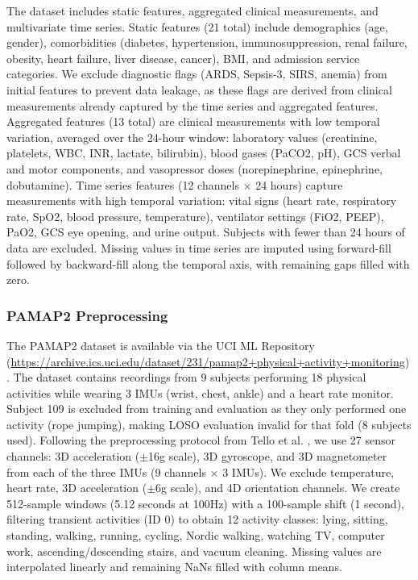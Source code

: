 \documentclass[times, review, 10pt]{elsarticle}
\begin{document}
The dataset includes static features, aggregated clinical measurements, and multivariate time
series. Static features (21 total) include demographics (age, gender), comorbidities (diabetes,
hypertension, immunosuppression, renal failure, obesity, heart failure, liver disease, cancer),
BMI, and admission service categories. We exclude diagnostic flags (ARDS, Sepsis-3, SIRS,
anemia) from initial features to prevent data leakage, as these flags are derived from clinical
measurements already captured by the time series and aggregated features.
Aggregated features (13 total) are clinical measurements with low temporal
variation, averaged over the 24-hour window: laboratory values (creatinine,
platelets, WBC, INR, lactate, bilirubin), blood gases (PaCO2, pH), GCS verbal
and motor components, and vasopressor doses (norepinephrine, epinephrine, dobutamine).
Time series features (12 channels $\times$ 24 hours) capture measurements with
high temporal variation: vital signs (heart rate, respiratory rate, SpO2,
blood pressure, temperature), ventilator settings (FiO2, PEEP), PaO2, GCS eye opening, and urine output.
Subjects with fewer than 24 hours of data are excluded. Missing values in time series are imputed using forward-fill followed by
backward-fill along the temporal axis, with remaining gaps filled with zero.


\subsubsection{PAMAP2 Preprocessing}

The PAMAP2 dataset is available via the UCI ML Repository
(\url{https://archive.ics.uci.edu/dataset/231/pamap2+physical+activity+monitoring}).
The dataset contains recordings from 9 subjects performing 18 physical
activities while wearing 3 IMUs (wrist, chest, ankle) and a heart rate monitor.
Subject 109 is excluded from training and evaluation as they only performed one activity
(rope jumping), making LOSO evaluation invalid for that fold (8 subjects used).
Following the preprocessing protocol from Tello et al. \cite{tello2025contrasting}, we
use 27 sensor channels: 3D acceleration ($\pm$16g scale), 3D gyroscope, and
3D magnetometer from each of the three IMUs (9 channels $\times$ 3 IMUs).
We exclude temperature, heart rate, 3D acceleration ($\pm$6g scale), and 4D orientation channels.
We create 512-sample windows (5.12 seconds at 100Hz) with a 100-sample shift
(1 second), filtering transient activities (ID 0) to obtain 12 activity
classes: lying, sitting, standing, walking, running, cycling, Nordic walking,
watching TV, computer work, ascending/descending stairs, and vacuum cleaning.
Missing values are interpolated linearly and remaining NaNs filled with column means.
\end{document}
